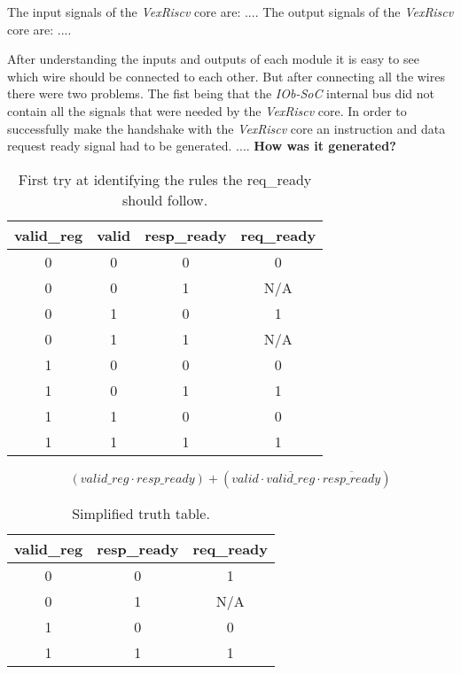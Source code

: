 The input signals of the \textit{VexRiscv} core are: .... The output signals of the \textit{VexRiscv} core are: ....

After understanding the inputs and outputs of each module it is easy to see which wire should be connected to each other. But after connecting all the wires there were two problems. The fist being that the \textit{IOb-SoC} internal bus did not   contain all the signals that were needed by the \textit{VexRiscv} core. In order to successfully make the handshake with the \textit{VexRiscv} core an instruction and data request ready signal had to be generated. .... \textbf{How was it generated?}

\begin{table}[!h]
  \centering
  \begin{tabular}{ccc|c}
  valid\_reg & valid & resp\_ready & req\_ready \\ \hline
  0          & 0     & 0           & 0          \\
  0          & 0     & 1           & N/A        \\
  0          & 1     & 0           & 1          \\
  0          & 1     & 1           & N/A        \\
  1          & 0     & 0           & 0          \\
  1          & 0     & 1           & 1          \\
  1          & 1     & 0           & 0          \\
  1          & 1     & 1           & 1         
  \end{tabular}
  \caption{First try at identifying the rules the req\_ready should follow.}
  \label{tab:first_truth_table}
\end{table}

\begin{equation}
  (valid\_reg \cdot resp\_ready) + (valid \cdot \overline{valid\_reg} \cdot \overline{resp\_ready})
  \label{eq:first_logic_eq}
\end{equation}

\begin{table}[!ht]
  \centering
  \begin{tabular}{cc|c}
  valid\_reg & resp\_ready & req\_ready \\ \hline
  0          & 0           & 1          \\
  0          & 1           & N/A        \\
  1          & 0           & 0          \\
  1          & 1           & 1         
  \end{tabular}
  \caption{Simplified truth table.}
  \label{tab:simple_truth_table}
\end{table}

